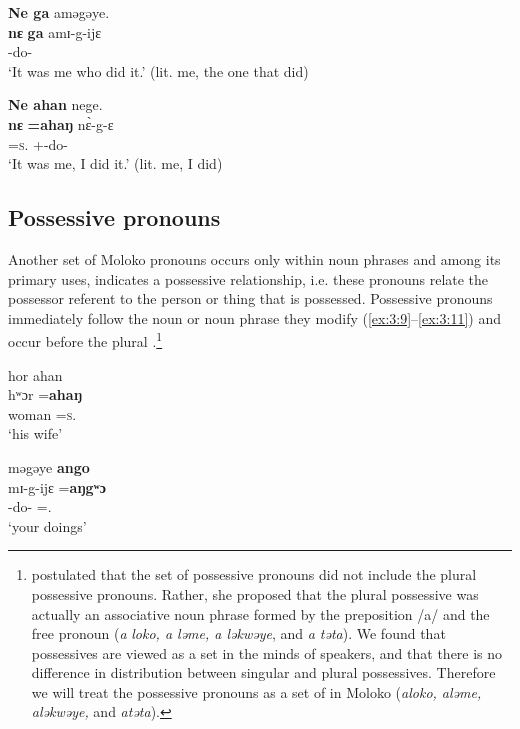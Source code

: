 \ea \label{ex:3:7}
\textbf{Ne  ga}  aməgəye.\\ 
\gll  \textbf{nɛ}  \textbf{ga}     amɪ-g-ijɛ \\
      {\oneS}   {\ADJ}    {\DEP}-do-{\CL}\\
\glt  ‘It was me who did it.’ (lit. me, the one that did)
\z

\ea \label{ex:3:8}
\textbf{Ne  ahan}  nege.\\
\gll  \textbf{nɛ}  \textbf{=ahaŋ}     n\`{ɛ}-g-ɛ\\
      {\oneS}  =\textsc{s}.{\POSS}  {\oneS}+{\PFV}-do-{\CL}\\
\glt  ‘It was me, I did it.’ (lit. me, I did)
\z

\subsection{Possessive pronouns}\label{sec:3.1.2}
\hypertarget{RefHeading1210861525720847}{}
\largerpage[2]
Another set of Moloko pronouns occurs only within noun phrases and among its primary uses, indicates a possessive relationship, i.e. these pronouns relate the possessor referent to the person or thing that is possessed. Possessive pronouns immediately follow the noun or noun phrase they modify (\ref{ex:3:9}--\ref{ex:3:11}) and occur before the plural .\footnote{\citet{Bow1997c} postulated that the set of possessive pronouns did not include the plural possessive pronouns. Rather, she proposed that the plural possessive was actually an associative noun phrase formed by the preposition /a/ and the free pronoun (\textit{a} \textit{loko, a ləme, a ləkwəye}, and \textit{a təta}). We found that possessives are viewed as a set in the minds of speakers, and that there is no difference in distribution between singular and plural possessives. Therefore we will treat the possessive pronouns as a set of in Moloko (\textit{aloko, aləme, aləkwəye, } and \textit{ atəta}). }  

\ea \label{ex:3:9}
hor  ahan\\
\gll  hʷɔr   =\textbf{ahaŋ}\\
      woman  =\textsc{s}.{\POSS}\\
\glt  ‘his wife’
\z

\ea \label{ex:3:10}
məgəye  \textbf{ango}\\
\gll  mɪ-g-ijɛ   =\textbf{aŋgʷɔ}\\
      {\NOM}{}-do-{\CL}  ={\twoS}.{\POSS}\\
\glt  ‘your doings’
\z

